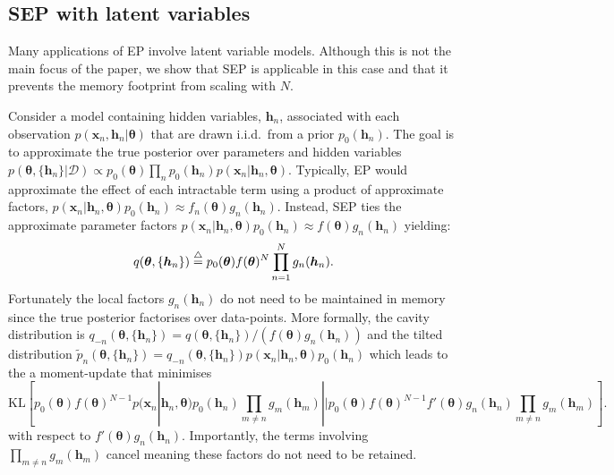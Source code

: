 
\subsection{SEP with latent variables}

Many applications of EP involve latent variable models. Although this is not the main focus of the paper, we show that SEP is applicable in this case and that it prevents the memory footprint from scaling with $N$. 

Consider a model containing hidden variables, $\bm{h}_n$, associated with each observation $p(\bm{x}_n, \bm{h}_n | \bm{\theta})$  that are drawn i.i.d.~from a prior $p_0(\bm{h}_n)$. The goal is to approximate the true posterior over parameters and hidden variables $p(\bm{\theta}, \{ \bm{h}_n\} | \mathcal{D}) \propto p_0(\bm{\theta}) \prod_n p_0(\bm{h}_n) p(\bm{x}_n | \bm{h}_n, \bm{\theta})$. 
%
Typically, EP would approximate the effect of each intractable term using a product of approximate factors, $p(\bm{x}_n | \bm{h}_n, \bm{\theta})p_0(\bm{h}_n)  \approx f_n(\bm{\theta}) g_n(\bm{h}_n) $. Instead, SEP ties the approximate parameter factors $p(\bm{x}_n | \bm{h}_n, \bm{\theta})p_0(\bm{h}_n)  \approx f(\bm{\theta}) g_n(\bm{h}_n) $ yielding:
\begin{equation}
q(\bm{\theta}, \{ \bm{h}_n\}) \buildrel\triangle\over = p_0(\bm{\theta}) f(\bm{\theta})^N \prod_{n=1}^N g_n(\bm{h}_n) .
\end{equation}
%
Fortunately the local factors $g_n(\bm{h}_n)$ do not need to be maintained in memory since the true posterior factorises over data-points. More formally, the cavity distribution is $q_{-n}(\bm{\theta}, \{ \bm{h}_n\}) = q(\bm{\theta}, \{ \bm{h}_n\})/(f(\bm{\theta}) g_n(\bm{h}_n)) $ and the tilted distribution $\tilde{p}_n(\bm{\theta}, \{ \bm{h}_n\}) = q_{-n}(\bm{\theta}, \{ \bm{h}_n\}) p(\bm{x}_n | \bm{h}_n, \bm{\theta})p_0(\bm{h}_n)$ which leads to the a moment-update that minimises 
%
\begin{equation}
\mathrm{KL}[ p_0(\bm{\theta}) f(\bm{\theta})^{N-1} p(\bm{x}_n | \bm{h}_n, \bm{\theta})p_0(\bm{h}_n) \prod_{m\ne n} g_m(\bm{h}_m) || p_0(\bm{\theta}) f(\bm{\theta})^{N-1} f'(\bm{\theta}) g_n(\bm{h}_n) \prod_{m\ne n} g_m(\bm{h}_m)] .\nonumber
\end{equation}
%
with respect to $f'(\bm{\theta}) g_n(\bm{h}_n)$. Importantly, the terms involving $\prod_{m\ne n} g_m(\bm{h}_m)$ cancel meaning these factors do not need to be retained.



